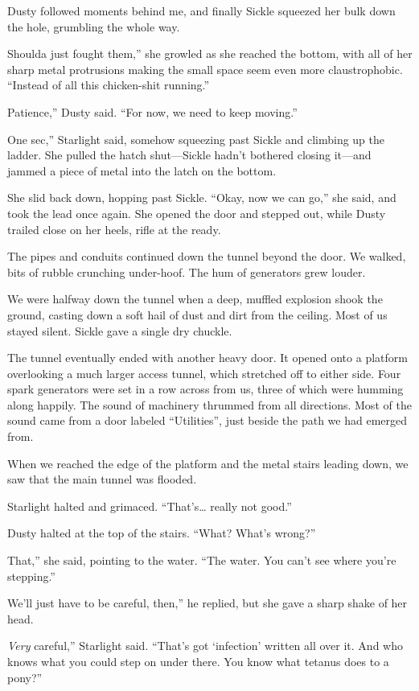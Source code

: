 Dusty followed moments behind me, and finally Sickle squeezed her bulk down the hole, grumbling the whole way.

\leavevmode{}Shoulda just fought them,” she growled as she reached the bottom, with all of her sharp metal protrusions making the small space seem even more claustrophobic. “Instead of all this chicken-shit running.”

\leavevmode{}Patience,” Dusty said. “For now, we need to keep moving.”

\leavevmode{}One sec,” Starlight said, somehow squeezing past Sickle and climbing up the ladder. She pulled the hatch shut—Sickle hadn’t bothered closing it—and jammed a piece of metal into the latch on the bottom.

She slid back down, hopping past Sickle. “Okay, now we can go,” she said, and took the lead once again. She opened the door and stepped out, while Dusty trailed close on her heels, rifle at the ready.

The pipes and conduits continued down the tunnel beyond the door. We walked, bits of rubble crunching under-hoof. The hum of generators grew louder.

We were halfway down the tunnel when a deep, muffled explosion shook the ground, casting down a soft hail of dust and dirt from the ceiling. Most of us stayed silent. Sickle gave a single dry chuckle.

The tunnel eventually ended with another heavy door. It opened onto a platform overlooking a much larger access tunnel, which stretched off to either side. Four spark generators were set in a row across from us, three of which were humming along happily. The sound of machinery thrummed from all directions. Most of the sound came from a door labeled “Utilities”, just beside the path we had emerged from.

When we reached the edge of the platform and the metal stairs leading down, we saw that the main tunnel was flooded.

Starlight halted and grimaced. “That’s… really not good.”

Dusty halted at the top of the stairs. “What? What’s wrong?”

\leavevmode{}That,” she said, pointing to the water. “The water. You can’t see where you’re stepping.”

\leavevmode{}We’ll just have to be careful, then,” he replied, but she gave a sharp shake of her head.

\leavevmode{}\textit{Very} careful,” Starlight said. “That’s got ‘infection’ written all over it. And who knows what you could step on under there. You know what tetanus does to a pony?”

